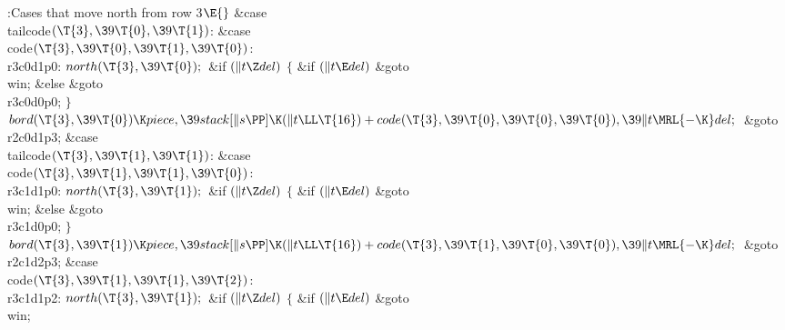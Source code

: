 \B{}:Cases that move north from row 3\X${}\E{}$\6
\4\&{case} \\{tailcode}${}(\T{3},\39\T{0},\39\T{1}){}$:\5
\&{case} \\{code}${}(\T{3},\39\T{0},\39\T{1},\39\T{0}){}$:\5
\\{r3c0d1p0}:\5
${}\\{north}(\T{3},\39\T{0});{}$\6
\&{if} ${}(\|t\Z\\{del}){}$\5
${}\{{}$\5
\1\&{if} ${}(\|t\E\\{del}){}$\1\5
\&{goto} \\{win};\5
\2\&{else}\1\5
\&{goto} \\{r3c0d0p0};\5
\2${}\}{}$\2\6
${}\\{bord}(\T{3},\39\T{0})\K\\{piece},\39\\{stack}[\|s\PP]\K(\|t\LL\T{16})+%
\\{code}(\T{3},\39\T{0},\39\T{0},\39\T{0}),\39\|t\MRL{-{\K}}\\{del};{}$\6
\&{goto} \\{r2c0d1p3};\6
\4\&{case} \\{tailcode}${}(\T{3},\39\T{1},\39\T{1}){}$:\5
\&{case} \\{code}${}(\T{3},\39\T{1},\39\T{1},\39\T{0}){}$:\5
\\{r3c1d1p0}:\5
${}\\{north}(\T{3},\39\T{1});{}$\6
\&{if} ${}(\|t\Z\\{del}){}$\5
${}\{{}$\5
\1\&{if} ${}(\|t\E\\{del}){}$\1\5
\&{goto} \\{win};\5
\2\&{else}\1\5
\&{goto} \\{r3c1d0p0};\5
\2${}\}{}$\2\6
${}\\{bord}(\T{3},\39\T{1})\K\\{piece},\39\\{stack}[\|s\PP]\K(\|t\LL\T{16})+%
\\{code}(\T{3},\39\T{1},\39\T{0},\39\T{0}),\39\|t\MRL{-{\K}}\\{del};{}$\6
\&{goto} \\{r2c1d2p3};\6
\4\&{case} \\{code}${}(\T{3},\39\T{1},\39\T{1},\39\T{2}){}$:\5
\\{r3c1d1p2}:\5
${}\\{north}(\T{3},\39\T{1});{}$\6
\&{if} ${}(\|t\Z\\{del}){}$\5
${}\{{}$\5
\1\&{if} ${}(\|t\E\\{del}){}$\1\5
\&{goto} \\{win};\5
